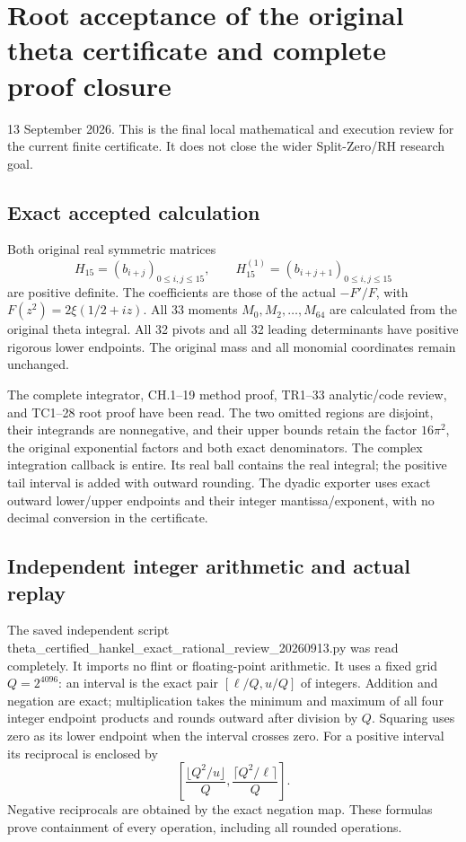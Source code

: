 \section{Root acceptance of the original theta certificate and complete proof closure}\label{root-acceptance-of-the-original-theta-certificate-and-complete-proof-closure}

13 September 2026. This is the final local mathematical and execution review for the current finite certificate. It does not close the wider Split-Zero/RH research goal.

\subsection{Exact accepted calculation}\label{exact-accepted-calculation}

Both original real symmetric matrices \[
H_{15}=(b_{i+j})_{0\le i,j\le15},\qquad
H_{15}^{(1)}=(b_{i+j+1})_{0\le i,j\le15}
\] are positive definite. The coefficients are those of the actual \(-F'/F\), with \(F(z^2)=2\xi(1/2+iz)\). All 33 moments \(M_0,M_2,\ldots,M_{64}\) are calculated from the original theta integral. All 32 pivots and all 32 leading determinants have positive rigorous lower endpoints. The original mass and all monomial coordinates remain unchanged.

The complete integrator, CH.1--19 method proof, TR1--33 analytic/code review, and TC1--28 root proof have been read. The two omitted regions are disjoint, their integrands are nonnegative, and their upper bounds retain the factor \(16\pi^2\), the original exponential factors and both exact denominators. The complex integration callback is entire. Its real ball contains the real integral; the positive tail interval is added with outward rounding. The dyadic exporter uses exact outward lower/upper endpoints and their integer mantissa/exponent, with no decimal conversion in the certificate.

\subsection{Independent integer arithmetic and actual replay}\label{independent-integer-arithmetic-and-actual-replay}

The saved independent script theta\_certified\_hankel\_exact\_rational\_review\_20260913.py was read completely. It imports no flint or floating-point arithmetic. It uses a fixed grid \(Q=2^{4096}\): an interval is the exact pair \([\ell/Q,u/Q]\) of integers. Addition and negation are exact; multiplication takes the minimum and maximum of all four integer endpoint products and rounds outward after division by \(Q\). Squaring uses zero as its lower endpoint when the interval crosses zero. For a positive interval its reciprocal is enclosed by \[
\left[
\frac{\lfloor Q^2/u\rfloor}{Q},
\frac{\lceil Q^2/\ell\rceil}{Q}
\right].
\] Negative reciprocals are obtained by the exact negation map. These formulas prove containment of every operation, including all rounded operations.

